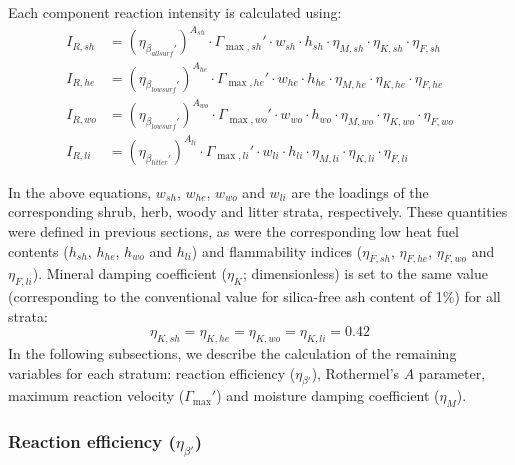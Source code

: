 \documentclass[]{book}
\begin{document}
Each component reaction intensity is calculated using:
\begin{eqnarray} 
I_{R,sh} &= (\eta_{\beta_{allsurf}'})^{A_{sh}}\cdot \Gamma_{\max, sh}'\cdot w_{sh} \cdot h_{sh} \cdot \eta_{M,sh}\cdot \eta_{K,sh}\cdot \eta_{F,sh}\\
I_{R,he} &= (\eta_{\beta_{lowsurf}'})^{A_{he}}\cdot \Gamma_{\max, he}'\cdot w_{he} \cdot h_{he} \cdot \eta_{M,he}\cdot \eta_{K,he}\cdot \eta_{F,he}\\
I_{R,wo} &= (\eta_{\beta_{lowsurf}'})^{A_{wo}}\cdot \Gamma_{\max, wo}'\cdot w_{wo} \cdot h_{wo} \cdot \eta_{M,wo}\cdot \eta_{K,wo}\cdot \eta_{F,wo}\\
I_{R,li} &= (\eta_{\beta_{litter}'})^{A_{li}}\cdot \Gamma_{\max, li}'\cdot w_{li} \cdot h_{li} \cdot \eta_{M,li}\cdot \eta_{K,li}\cdot \eta_{F,li}
\label{eq:reactintensitycomp}
\end{eqnarray}

In the above equations, \(w_{sh}\), \(w_{he}\), \(w_{wo}\) and \(w_{li}\) are the loadings of the corresponding shrub, herb, woody and litter strata, respectively. These quantities were defined in previous sections, as were the corresponding low heat fuel contents (\(h_{sh}\), \(h_{he}\), \(h_{wo}\) and \(h_{li}\)) and flammability indices (\(\eta_{F,sh}\), \(\eta_{F,he}\), \(\eta_{F,wo}\) and \(\eta_{F,li}\)). Mineral damping coefficient (\(\eta_{K}\); dimensionless) is set to the same value (corresponding to the conventional value for silica-free ash content of 1\%) for all strata:
\begin{equation}
\eta_{K,sh} = \eta_{K,he} =\eta_{K,wo} = \eta_{K,li} = 0.42
\end{equation}
In the following subsections, we describe the calculation of the remaining variables for each stratum: reaction efficiency (\(\eta_{\beta'}\)), Rothermel's \(A\) parameter, maximum reaction velocity (\(\Gamma_{\max}'\)) and moisture damping coefficient (\(\eta_{M}\)).

\hypertarget{reaction-efficiency-eta_beta}{%
\subsubsection{\texorpdfstring{Reaction efficiency (\(\eta_{\beta'}\))}{Reaction efficiency (\textbackslash{}eta\_\{\textbackslash{}beta'\})}}\label{reaction-efficiency-eta_beta}}
\end{document}
